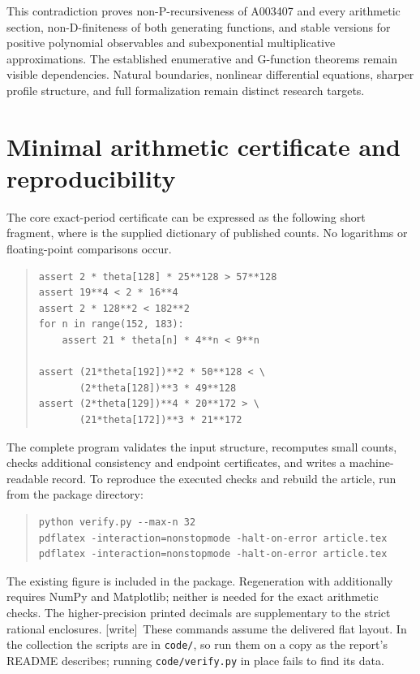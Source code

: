 \documentclass[11pt,a4paper]{article}
\numberwithin{equation}{section}
\theoremstyle{definition}
\theoremstyle{remark}
\newcommand{\code}[1]{\texttt{\detokenize{#1}}}
\newcommand{\wtag}{\textup{[write]}}
\newcommand{\lean}[1]{\nolinkurl{#1}}
\theoremstyle{definition}
\theoremstyle{plain}
\begin{document}
This contradiction proves non-P-recursiveness of A003407 and every
arithmetic section, non-D-finiteness of both generating functions, and
stable versions for positive polynomial observables and subexponential
multiplicative approximations. The established enumerative and G-function
theorems remain visible dependencies. Natural boundaries, nonlinear
differential equations, sharper profile structure, and full formalization
remain distinct research targets.


\appendix
\section{Minimal arithmetic certificate and reproducibility}
The core exact-period certificate can be expressed as the following short
fragment, where \code{theta} is the supplied dictionary of published counts.
No logarithms or floating-point comparisons occur.
\begin{quote}\small
\begin{verbatim}
assert 2 * theta[128] * 25**128 > 57**128
assert 19**4 < 2 * 16**4
assert 2 * 128**2 < 182**2
for n in range(152, 183):
    assert 21 * theta[n] * 4**n < 9**n

assert (21*theta[192])**2 * 50**128 < \
       (2*theta[128])**3 * 49**128
assert (2*theta[129])**4 * 20**172 > \
       (21*theta[172])**3 * 21**172
\end{verbatim}
\end{quote}
The complete program validates the input structure, recomputes small counts,
checks additional consistency and endpoint certificates, and writes a
machine-readable record. To reproduce the executed checks and rebuild the
article, run from the package directory:
\begin{quote}\small
\begin{verbatim}
python verify.py --max-n 32
pdflatex -interaction=nonstopmode -halt-on-error article.tex
pdflatex -interaction=nonstopmode -halt-on-error article.tex
\end{verbatim}
\end{quote}
The existing figure is included in the package. Regeneration with
\code{python plot_profile.py} additionally requires NumPy and Matplotlib;
neither is needed for the exact arithmetic checks. The higher-precision
printed decimals are supplementary to the strict rational enclosures.
\wtag\ These commands assume the delivered flat layout. In the collection the
scripts are in \lean{code/}, so run them on a copy as the report's README
describes; running \lean{code/verify.py} in place fails to find its data.
\end{document}

